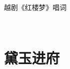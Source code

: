 \documentclass{article}
\newenvironment{lpar}{\vspace{-1ex}\begin{longtable}{lp{0.85\columnwidth}}}{\end{longtable}}
\newcommand\lver[2]{\vspace{1ex}#1&#2\\}
\begin{document}
\begin{center}\heiti\LARGE 越剧《红楼梦》唱词\end{center}
\kaiti\large

\ 

\setlength\LTleft\parindent
%

\section{黛玉进府}
\end{document}
